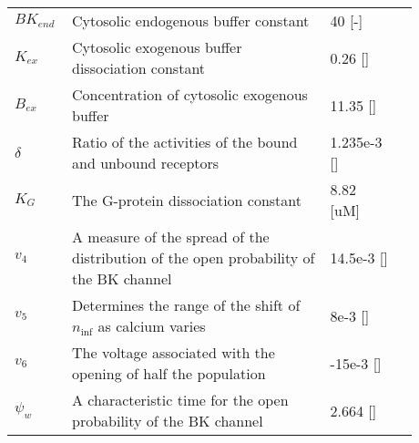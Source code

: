 \begin{table}[h!]
	\centering
	\begin{tabular}{| p{0.09\linewidth} | >{\footnotesize} p{0.6\linewidth} | >{\footnotesize} p{0.17\linewidth} | >{\footnotesize} p{0.02\linewidth} |}
		\arrayrulecolor{lightgrey}\hline
		
		$BK_{end}$      & Cytosolic endogenous buffer constant                              & 40 [-] & \cite{LoesEvert} \\
		$K_{ex}$        & Cytosolic exogenous buffer dissociation constant                  & 0.26 [\uM] & \cite{LoesEvert} \\
		$B_{ex}$        & Concentration of cytosolic exogenous buffer                       & 11.35 [\uM] & \cite{LoesEvert} \\
		$\delta$        & Ratio of the activities of the bound and unbound receptors        & 1.235e-3 [\uM] & \cite{LoesEvert}\\
		$K_G$           & The G-protein dissociation constant                               & 8.82  [uM] & \cite{LoesEvert}\\
		$v_{4}$			& A measure of the spread of the distribution of the open probability of the BK channel	& 14.5e-3 [\Volt]   &  \cite{Gonzalez1994} \\
		$v_{5}$			& Determines the range of the shift of $n_{\inf}$ as calcium varies    	& 8e-3 [\Volt]  & \cite{LoesEvert}  \\
		$v_{6}$			& The voltage associated with the opening of half the population		& -15e-3 [\Volt]  & \cite{LoesEvert}  \\
		$ \psi_{w}$    	& A characteristic time for the open probability of the BK channel		& 2.664 [\pers] & \cite{Gonzalez1994} \\
		
		\hline
	\end{tabular}
\end{table}
